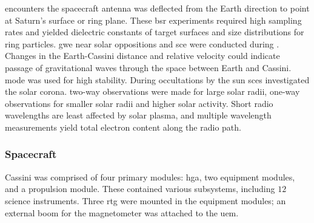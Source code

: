 \documentclass[crop=false,class=article,oneside]{standalone}
\begin{document}
            encounters the spacecraft antenna was deflected
            from the Earth direction to point at Saturn's
            surface or ring plane. These
            \gls{bsr} experiments required high
            \glspl{sampling rate} and yielded dielectric
            constants of target surfaces and size
            distributions for ring particles. \gls{gwe}
            near \glspl{solar opposition} and \gls{sce}
            were conducted during
            .
            Changes in the Earth-Cassini distance and
            \gls{relative velocity} could indicate passage
            of gravitational waves through the space
            between Earth and Cassini.
             mode
            was used for high stability. During
            \glspl{occultation} by the sun \glspl{sce}
            investigated the \gls{solar corona}.
            \Glspl{two-way observation} were made for
            large solar radii, \glspl{one-way observation}
            for smaller solar radii and higher solar
            activity. Short radio \glspl{wavelength} are
            least affected by \gls{solar plasma}, and
            multiple \gls{wavelength} measurements yield
            total \gls{electron} content along the
            \gls{radio path}.
        \subsubsection{Spacecraft}
            \label{subsubsec:usr_spacecraft}
            Cassini was comprised of four primary modules:
            \gls{hga}, two equipment modules, and a
            propulsion module. These contained various
            subsystems, including $12$ science instruments.
            Three \gls{rtg} were mounted in the equipment
            modules; an external boom for the magnetometer
            was attached to the \gls{uem}.
\end{document}
